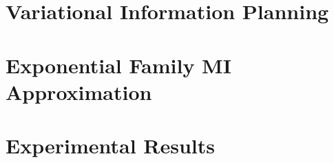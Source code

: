 \documentclass[twoside]{article}
\begin{document}
\section{Variational Information Planning}



\section{Exponential Family MI Approximation}


\section{Experimental Results}




\end{document}
